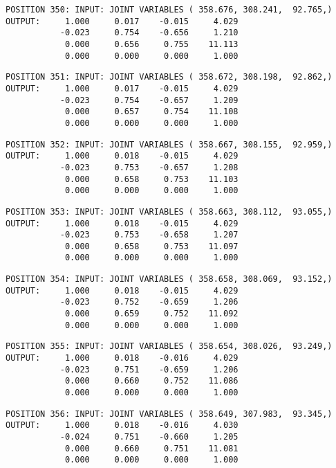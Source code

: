 \begin{verbatim}
POSITION 350: INPUT: JOINT VARIABLES ( 358.676, 308.241,  92.765,)
OUTPUT:     1.000     0.017    -0.015     4.029
           -0.023     0.754    -0.656     1.210
            0.000     0.656     0.755    11.113
            0.000     0.000     0.000     1.000
\end{verbatim} \pagebreak[1]\begin{verbatim}
POSITION 351: INPUT: JOINT VARIABLES ( 358.672, 308.198,  92.862,)
OUTPUT:     1.000     0.017    -0.015     4.029
           -0.023     0.754    -0.657     1.209
            0.000     0.657     0.754    11.108
            0.000     0.000     0.000     1.000
\end{verbatim} \pagebreak[1]\begin{verbatim}
POSITION 352: INPUT: JOINT VARIABLES ( 358.667, 308.155,  92.959,)
OUTPUT:     1.000     0.018    -0.015     4.029
           -0.023     0.753    -0.657     1.208
            0.000     0.658     0.753    11.103
            0.000     0.000     0.000     1.000
\end{verbatim} \pagebreak[1]\begin{verbatim}
POSITION 353: INPUT: JOINT VARIABLES ( 358.663, 308.112,  93.055,)
OUTPUT:     1.000     0.018    -0.015     4.029
           -0.023     0.753    -0.658     1.207
            0.000     0.658     0.753    11.097
            0.000     0.000     0.000     1.000
\end{verbatim} \pagebreak[1]\begin{verbatim}
POSITION 354: INPUT: JOINT VARIABLES ( 358.658, 308.069,  93.152,)
OUTPUT:     1.000     0.018    -0.015     4.029
           -0.023     0.752    -0.659     1.206
            0.000     0.659     0.752    11.092
            0.000     0.000     0.000     1.000
\end{verbatim} \pagebreak[1]\begin{verbatim}
POSITION 355: INPUT: JOINT VARIABLES ( 358.654, 308.026,  93.249,)
OUTPUT:     1.000     0.018    -0.016     4.029
           -0.023     0.751    -0.659     1.206
            0.000     0.660     0.752    11.086
            0.000     0.000     0.000     1.000
\end{verbatim} \pagebreak[1]\begin{verbatim}
POSITION 356: INPUT: JOINT VARIABLES ( 358.649, 307.983,  93.345,)
OUTPUT:     1.000     0.018    -0.016     4.030
           -0.024     0.751    -0.660     1.205
            0.000     0.660     0.751    11.081
            0.000     0.000     0.000     1.000
\end{verbatim} \pagebreak[1]\begin{verbatim}

\end{verbatim}
